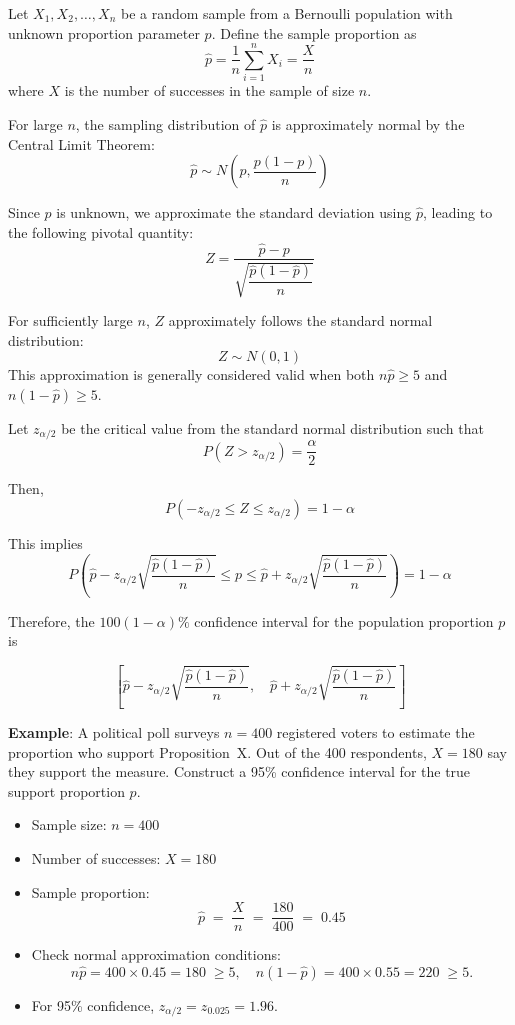 \documentclass[twoside]{book}
\begin{document}
Let $X_1, X_2, \dots, X_n$ be a random sample from a Bernoulli population with unknown proportion parameter $p$. Define the sample proportion as
\[
\hat{p} = \frac{1}{n} \sum_{i=1}^{n} X_i = \frac{X}{n}
\]
where $X$ is the number of successes in the sample of size $n$.

For large $n$, the sampling distribution of $\hat{p}$ is approximately normal by the Central Limit Theorem:
\[
\hat{p} \sim N\left(p, \frac{p(1 - p)}{n}\right)
\]

Since $p$ is unknown, we approximate the standard deviation using $\hat{p}$, leading to the following pivotal quantity:
\[
Z = \frac{\hat{p} - p}{\sqrt{\dfrac{\hat{p}(1 - \hat{p})}{n}}}
\]

For sufficiently large $n$, $Z$ approximately follows the standard normal distribution:
\[
Z \sim N(0, 1)
\]
This approximation is generally considered valid when both \( n\hat{p} \geq 5 \) and \( n(1-\hat{p}) \geq 5 \).

Let $z_{\alpha/2}$ be the critical value from the standard normal distribution such that
\[
P(Z > z_{\alpha/2}) = \frac{\alpha}{2}
\]

Then,
\[
P\left(-z_{\alpha/2} \leq Z \leq z_{\alpha/2}\right) = 1 - \alpha
\]

This implies
\[
P\left(\hat{p} - z_{\alpha/2} \sqrt{\frac{\hat{p}(1 - \hat{p})}{n}} \leq p \leq \hat{p} + z_{\alpha/2} \sqrt{\frac{\hat{p}(1 - \hat{p})}{n}}\right) = 1 - \alpha
\]

Therefore, the $100(1 - \alpha)\%$ confidence interval for the population proportion $p$ is
\begin{textbox}
\[
\left[ \hat{p} - z_{\alpha/2} \sqrt{\frac{\hat{p}(1 - \hat{p})}{n}}, \quad \hat{p} + z_{\alpha/2} \sqrt{\frac{\hat{p}(1 - \hat{p})}{n}} \right]
\]
\end{textbox}

\bigskip

\textbf{Example}: A political poll surveys $n = 400$ registered voters to estimate the proportion who support Proposition~X. Out of the 400 respondents, $X = 180$ say they support the measure. Construct a 95\% confidence interval for the true support proportion $p$.

\begin{itemize}
	\item Sample size: $n = 400$
	\item Number of successes: $X = 180$
	\item Sample proportion:
	\[
	\hat{p} \;=\; \frac{X}{n} \;=\; \frac{180}{400} \;=\; 0.45
	\]
	\item Check normal approximation conditions:
	\[
	n\hat{p} = 400 \times 0.45 = 180 \;\ge 5,
	\quad
	n(1 - \hat{p}) = 400 \times 0.55 = 220 \;\ge 5.
	\]
	\item For 95\% confidence, $z_{\alpha/2} = z_{0.025} = 1.96$.
\end{itemize}
\end{document}
